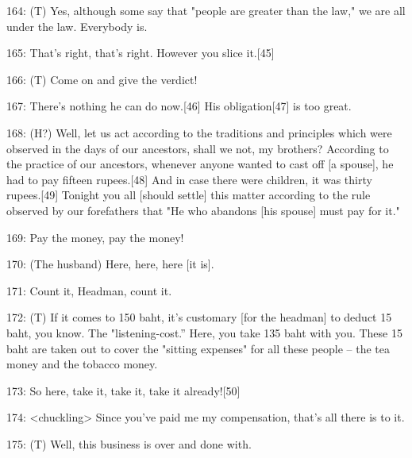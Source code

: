 {164: (T) Yes, although some say that "people are greater than
the law," we are all under the law. Everybody is. }

{165: That's right, that's right. However you slice}{\textbf{ }}{it.[45]}

{166: (T) Come on and give the verdict!}

{167: There's nothing he can do now.[46] His obligation[47] is too great.
}

{168: (H?) Well, let us act according to the traditions and principles which
were observed in the days of our ancestors, shall we not, my brothers? According
to the practice of our ancestors, whenever anyone wanted to cast off [a spouse],
he had to pay fifteen rupees.[48] And in case there were children, it was thirty
rupees.[49] Tonight you all [should settle] this matter according to the rule observed
by our forefathers that "He who abandons [his spouse] must pay for it."}

{169: Pay the money, pay the money!}

{170: (The husband) Here, here, here [it is].}

{171: Count it, Headman, count it.}

{172: (T) If it comes to 150 baht, it's customary [for the headman] to deduct
15 baht, you know. The "listening-cost.'' Here, you take 135 baht with
you. These 15 baht are taken out to cover the "sitting expenses"
for all these people -- the tea money and the tobacco money.}

{173: So here, take it, take it, take it already![50]}

{174: <chuckling> Since you've paid me my compensation,
that's all there is to it. }

{175: (T) Well, this business is over and done with.  }

